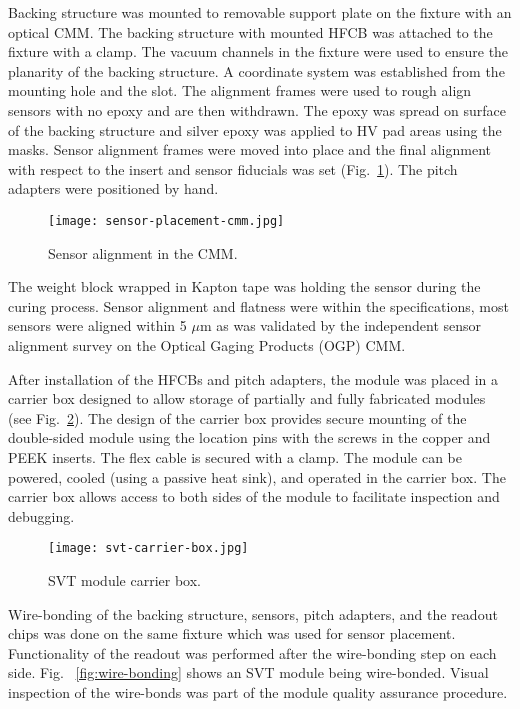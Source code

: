 Backing structure was mounted to removable support plate on the fixture with an optical CMM. The backing structure with mounted HFCB was attached to the fixture with a clamp. The vacuum channels in the fixture were used to ensure the planarity of the backing structure. A coordinate system was established from the mounting hole and the slot. The alignment frames were used to rough align sensors with no epoxy and are then withdrawn. 
 The epoxy was spread on surface of the backing structure and silver epoxy was applied to HV pad areas using the masks. Sensor alignment frames were moved into place and the final alignment with respect to the insert and sensor fiducials was set (Fig.~\ref{fig:sensor-placement-cmm}). The pitch adapters were positioned by hand. 
 
\begin{figure}[hbt] 
\centering 
\texttt{[image: sensor-placement-cmm.jpg]}
\caption{Sensor alignment in the CMM.}
\label{fig:sensor-placement-cmm}
\end{figure}

 The weight block wrapped in Kapton tape was holding the sensor during the curing process. Sensor alignment and flatness were within the specifications, most sensors were aligned within 5 $\mu$m as was validated by the independent sensor alignment survey on the Optical Gaging Products (OGP) CMM.

After installation of the HFCBs and pitch adapters, the module was placed in a carrier box designed to allow storage of partially and fully fabricated modules (see Fig.~\ref{fig:svt-carrier-box}). The design of the carrier box provides secure mounting of the double-sided module using the location pins with the screws in the copper and PEEK inserts. The flex cable is secured with a clamp. The module can be powered, cooled (using a passive heat sink), and operated in the carrier box. The carrier box allows access to both sides of the module to facilitate inspection and debugging. 

\begin{figure}[hbt] 
\centering 
\texttt{[image: svt-carrier-box.jpg]}
\caption{SVT module carrier box.}
\label{fig:svt-carrier-box}
\end{figure}

Wire-bonding of the backing structure, sensors, pitch adapters, and the readout chips was done on the same fixture which was used for sensor placement. Functionality of the readout was performed after the wire-bonding step on each side. Fig. ~\ref{fig:wire-bonding} shows an SVT module being wire-bonded. Visual inspection of the wire-bonds was part of the module quality assurance procedure.

